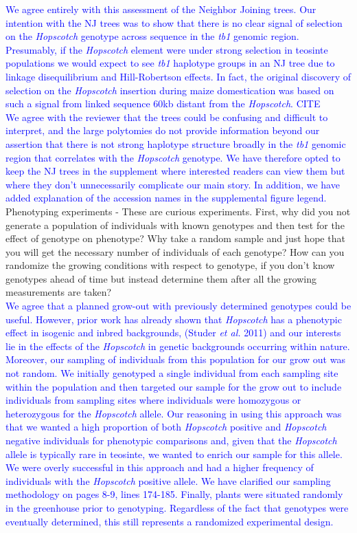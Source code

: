 \documentclass[11pt]{article}
\newcommand{\res}[1]{\noindent \textcolor{blue}{{#1}} \\}
\newcommand{\mbh}[1]{\noindent \textcolor{Dandelion}{{#1}}\\}
\begin{document}
\res{We agree entirely with this assessment of the Neighbor Joining trees. 
Our intention with the NJ trees was to show that there is no clear signal of selection on the \emph{Hopscotch} genotype across sequence in the \emph{tb1} genomic region.
Presumably, if the \emph{Hopscotch} element were under strong selection in teosinte populations we would expect to see \emph{tb1} haplotype groups in an NJ tree due to linkage disequilibrium and Hill-Robertson effects.
In fact, the original discovery of selection on the \emph{Hopscotch} insertion during maize domestication was based on such a signal from linked sequence 60kb distant from the \emph{Hopscotch}. \mbh{CITE} 
We agree with the reviewer that the trees could be confusing and difficult to interpret, and the large polytomies do not provide information beyond our assertion that there is not strong haplotype structure broadly in the \emph{tb1} genomic region that correlates with the \emph{Hopscotch} genotype.
We have therefore opted to keep the NJ trees in the supplement where interested readers can view them but where they don't unnecessarily complicate our main story.
In addition, we have added explanation of the accession names in the supplemental figure legend.}


Phenotyping experiments - These are curious experiments.  First, why did you not generate a population of individuals with known genotypes and then test for the effect of genotype on phenotype?  Why take a random sample and just hope that you will get the necessary number of individuals of each genotype?  How can you randomize the growing conditions with respect to genotype, if you don't know genotypes ahead of time but instead determine them after all the growing measurements are taken?\\

\res{We agree that a planned grow-out with previously determined genotypes could be useful.  
However, prior work has already shown that \emph{Hopscotch} has a phenotypic effect in isogenic and inbred backgrounds, (Studer \emph{et al.} 2011) and our interests lie in the effects of the \emph{Hopscotch} in genetic backgrounds occurring within nature.
Moreover, our sampling of individuals from this population for our grow out was not random.  
We initially genotyped a single individual from each sampling site within the population and then targeted our sample for the grow out to include individuals from sampling sites where individuals were homozygous or heterozygous for the \emph{Hopscotch} allele.
Our reasoning in using this approach was that we wanted a high proportion of both \emph{Hopscotch} positive and \emph{Hopscotch} negative individuals for phenotypic comparisons and, given that the \emph{Hopscotch} allele is typically rare in teosinte, we wanted to enrich our sample for this allele. 
We were overly successful in this approach and had a higher frequency of individuals with the \emph{Hopscotch} positive allele.
We have clarified our sampling methodology on pages 8-9, lines 174-185. Finally, plants were situated randomly in the greenhouse prior to genotyping.
Regardless of the fact that genotypes were eventually determined, this still represents a randomized experimental design.}
\end{document}
